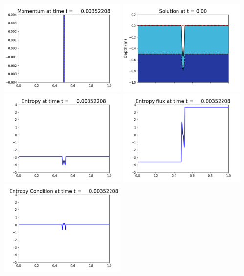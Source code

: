 \documentclass[11pt]{article}
\begin{document}
\vskip 10pt 
\includegraphics[width=0.475\textwidth]{frame0011fig1003.png}
\includegraphics[width=0.475\textwidth]{frame0011fig1006.png}
\vskip 10pt 
\includegraphics[width=0.475\textwidth]{frame0011fig1007.png}
\includegraphics[width=0.475\textwidth]{frame0011fig1008.png}
\vskip 10pt 
\includegraphics[width=0.475\textwidth]{frame0011fig1009.png}
\end{document}
